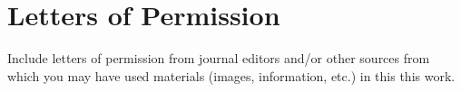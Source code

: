 \clearpage[\thispagestyle{empty}]
\chapter{Letters of Permission}

Include letters of permission from journal editors and/or other
sources from which you may have used materials (images, information, etc.)
in this this work.
